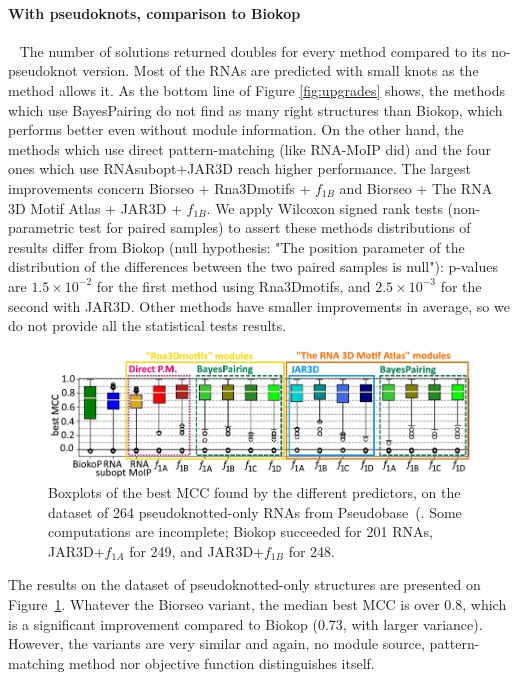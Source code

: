 \documentclass{bioinfo}
\begin{document}
\paragraph{With pseudoknots, comparison to Biokop} ~ The number of solutions returned doubles for every method compared to its no-pseudoknot version. Most of the RNAs are predicted with small knots as the method allows it. As the bottom line of Figure \ref{fig:upgrades} shows, the methods which use BayesPairing do not find as many right structures than  Biokop, which performs better even without module information. On the other hand, the methods which use direct pattern-matching (like RNA-MoIP did) and the four ones which use RNAsubopt+JAR3D reach higher performance. The largest improvements concern Biorseo + Rna3Dmotifs + $f_{1B}$ and Biorseo + The RNA 3D Motif Atlas + JAR3D + $f_{1B}$. We apply Wilcoxon signed rank tests (non-parametric test for paired samples) to assert these methods distributions of results differ from Biokop (null hypothesis: "The position parameter of the distribution of the differences between the two paired samples is null"): p-values are $1.5\times 10^{-2}$ for the first method using Rna3Dmotifs, and $2.5\times 10^{-3}$ for the second with JAR3D. Other methods have smaller improvements in average, so we do not provide all the statistical tests results.

\begin{figure}[t]
\centerline{\includegraphics[width=\linewidth]{fig/pseudobase_zoom.jpg}} 
\caption{Boxplots of the best MCC found by the different predictors, on the dataset of 264 pseudoknotted-only RNAs from Pseudobase~(\citealp{van2000pseudobase}. Some computations are incomplete; Biokop succeeded for 201 RNAs, JAR3D+$f_{1A}$ for 249, and JAR3D+$f_{1B}$ for 248. \label{fig:pseudobase}}
\end{figure}
The results on the dataset of pseudoknotted-only structures are presented on Figure~\ref{fig:pseudobase}. Whatever the Biorseo variant, the median best MCC is over 0.8, which is a significant improvement compared to Biokop (0.73, with larger variance). However, the variants are very similar and again, no module source, pattern-matching method nor objective function distinguishes itself.
\end{document}
